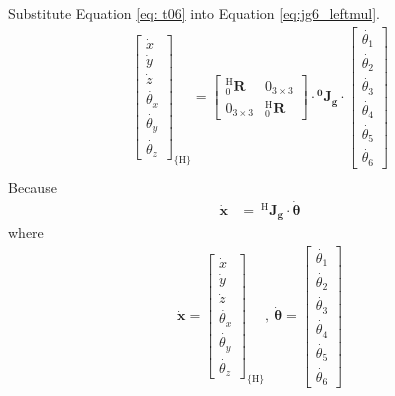 Substitute Equation \ref{eq: t06} into Equation \ref{eq:jg6_leftmul}.
\begin{equation}
\begin{split}
\begin{bmatrix}
\dot{x}\\
\dot{y}\\
\dot{z}\\
\dot{\theta _x}\\
\dot{\theta _y}\\
\dot{\theta _z}
\end{bmatrix}_{\!\{\mathrm{H}\}}
=
\begin{bmatrix}
^{\mathrm{H}}_0\mathbf{R} & 0_{ 3\times 3} \\ 
0_{ 3\times 3} & ^{\mathrm{H}}_{0}\mathbf{R}
\end{bmatrix}
\cdot
\mathbf{^0\!J_g} \cdot 
\begin{bmatrix}
\dot{\theta _1} \\ 
\dot{\theta _2} \\ 
\dot{\theta _3} \\ 
\dot{\theta _4} \\ 
\dot{\theta _5} \\ 
\dot{\theta _6} 
\end{bmatrix}\\
\end{split}
\end{equation}
Because 
\begin{equation}
\label{eq:jg6}
\begin{split}
\boldsymbol{\dot{x}} &= \ ^{\mathrm{H}}\!\mathbf{J_g} \cdot \boldsymbol{\dot{\theta}}		
\end{split}
\end{equation}
where
\begin{equation*}
\begin{split}
\boldsymbol{\dot{x}}
=
\begin{bmatrix}
\dot{x}\\
\dot{y}\\
\dot{z}\\
\dot{\theta _x}\\
\dot{\theta _y}\\
\dot{\theta _z}
\end{bmatrix}_{\!\{\mathrm{H}\}}
,\ 
\boldsymbol{\dot{\theta}}
=
\begin{bmatrix}
\dot{\theta _1} \\ 
\dot{\theta _2} \\ 
\dot{\theta _3} \\ 
\dot{\theta _4} \\ 
\dot{\theta _5} \\ 
\dot{\theta _6} 
\end{bmatrix}
\end{split}
\end{equation*}
